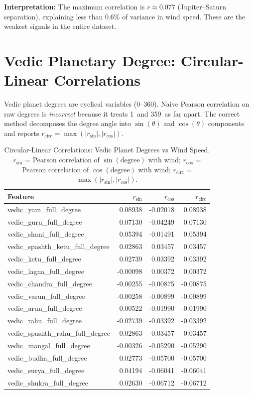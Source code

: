 \documentclass[11pt,a4paper]{article}
\begin{document}
\medskip
\noindent\textbf{Interpretation:} The maximum correlation is $r \approx 0.077$ (Jupiter--Saturn
separation), explaining less than $0.6\%$ of variance in wind speed. These are the
weakest signals in the entire dataset.

\section{Vedic Planetary Degree: Circular-Linear Correlations}

Vedic planet degrees are cyclical variables (0--360\textdegree). Naive Pearson
correlation on raw degrees is \emph{incorrect} because it treats 1\textdegree\ and
359\textdegree\ as far apart. The correct method decomposes the degree angle into
$\sin(\theta)$ and $\cos(\theta)$ components and reports
$r_{\text{circ}} = \max(|r_{\sin}|, |r_{\cos}|)$.

\begin{table}[H]
  \centering
  \caption{Circular-Linear Correlations: Vedic Planet Degrees vs Wind Speed.
           $r_{\sin}$ = Pearson correlation of $\sin(\text{degree})$ with wind;
           $r_{\cos}$ = Pearson correlation of $\cos(\text{degree})$ with wind;
           $r_{\text{circ}}$ = $\max(|r_{\sin}|, |r_{\cos}|)$.}
  \label{tab:vedic_circ}
  \begin{tabular}{lrrr}
    \toprule
    Feature & $r_{\sin}$ & $r_{\cos}$ & $r_{\text{circ}}$ \\
    \midrule
  vedic_yam_full_degree & 0.08938 & -0.02018 & 0.08938 \\
  vedic_guru_full_degree & 0.07130 & -0.04249 & 0.07130 \\
  vedic_shani_full_degree & 0.05394 & -0.01491 & 0.05394 \\
  vedic_spashth_ketu_full_degree & 0.02863 & 0.03457 & 0.03457 \\
  vedic_ketu_full_degree & 0.02739 & 0.03392 & 0.03392 \\
  vedic_lagna_full_degree & -0.00098 & 0.00372 & 0.00372 \\
  vedic_chandra_full_degree & -0.00255 & -0.00875 & -0.00875 \\
  vedic_varun_full_degree & -0.00258 & -0.00899 & -0.00899 \\
  vedic_arun_full_degree & 0.00522 & -0.01990 & -0.01990 \\
  vedic_rahu_full_degree & -0.02739 & -0.03392 & -0.03392 \\
  vedic_spashth_rahu_full_degree & -0.02863 & -0.03457 & -0.03457 \\
  vedic_mangal_full_degree & -0.00326 & -0.05290 & -0.05290 \\
  vedic_budha_full_degree & 0.02773 & -0.05700 & -0.05700 \\
  vedic_surya_full_degree & 0.04194 & -0.06041 & -0.06041 \\
  vedic_shukra_full_degree & 0.02630 & -0.06712 & -0.06712 \\
    \bottomrule
  \end{tabular}
\end{table}
\end{document}
